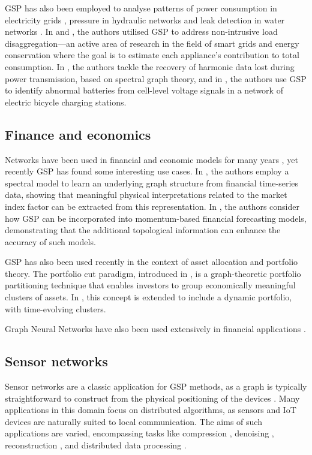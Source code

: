 GSP has also been employed to analyse patterns of power consumption in electricity grids \citep{Ramakrishna2021}, pressure in hydraulic networks \citep{Zhou2022} and leak detection in water networks \citep{Orn2022}. In \cite{He2018} and \cite{Zheng2022}, the authors utilised GSP to address non-intrusive load disaggregation—an active area of research in the field of smart grids and energy conservation where the goal is to estimate each appliance's contribution to total consumption. In \cite{Ying2022}, the authors tackle the recovery of harmonic data lost during power transmission, based on spectral graph theory, and in \cite{Wang2022b}, the authors use GSP to identify abnormal batteries from cell-level voltage signals in a network of electric bicycle charging stations.


\subsection{Finance and economics}

Networks have been used in financial and economic models for many years \citep{Marti2021}, yet recently GSP has found some interesting use cases. In \cite{Vinicius2020}, the authors employ a spectral model to learn an underlying graph structure from financial time-series data, showing that meaningful physical interpretations related to the market index factor can be extracted from this representation. In \citep{Zhang2023}, the authors consider how GSP can be incorporated into momentum-based financial forecasting models, demonstrating that the additional topological information can enhance the accuracy of such models.

GSP has also been used recently in the context of asset allocation and portfolio theory. The portfolio cut paradigm, introduced in \citep{Dees2020}, is a graph-theoretic portfolio partitioning technique that enables investors to group economically meaningful clusters of assets. In \citep{Arroyo2022}, this concept is extended to include a dynamic portfolio, with time-evolving clusters.

Graph Neural Networks have also been used extensively in financial applications \citep{Wang2022c}. 


\subsection{Sensor networks}

Sensor networks are a classic application for GSP methods, as a graph is typically straightforward to construct from the physical positioning of the devices \citep{Jablonski2017}. Many applications in this domain focus on distributed algorithms, as sensors and IoT devices are naturally suited to local communication. The aims of such applications are varied, encompassing tasks like compression \citep{Zhu2012}, denoising \citep{Tay2021}, reconstruction \citep{Wang2015}, and distributed data processing \citep{Chi2022}.


